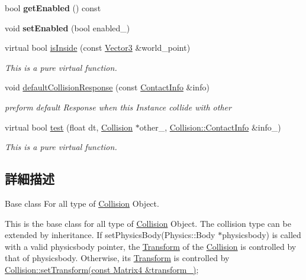 \begin{DoxyCompactItemize}
\item 
bool {\bfseries get\+Enabled} () const \hypertarget{class_i_dream_sky_1_1_collision_aa8e71c31006f4f13d8c3976605a68065}{}\label{class_i_dream_sky_1_1_collision_aa8e71c31006f4f13d8c3976605a68065}

\item 
void {\bfseries set\+Enabled} (bool enabled\+\_\+)\hypertarget{class_i_dream_sky_1_1_collision_a4cf7e1b0fc9cebfbf145265f0f21dfdc}{}\label{class_i_dream_sky_1_1_collision_a4cf7e1b0fc9cebfbf145265f0f21dfdc}

\item 
virtual bool \hyperlink{class_i_dream_sky_1_1_collision_ab68f79686bcba6964e528f46485c65f7}{is\+Inside} (const \hyperlink{class_i_dream_sky_1_1_vector3}{Vector3} \&world\+\_\+point)
\begin{DoxyCompactList}\small\item\em This is a pure virtual function. \end{DoxyCompactList}\item 
void \hyperlink{class_i_dream_sky_1_1_collision_a3add6ba3c46ce3a728b3f27ddefd81d2}{default\+Collision\+Response} (const \hyperlink{class_i_dream_sky_1_1_collision_1_1_contact_info}{Contact\+Info} \&info)
\begin{DoxyCompactList}\small\item\em preform default Response when this Instance collide with other \end{DoxyCompactList}\item 
virtual bool \hyperlink{class_i_dream_sky_1_1_collision_ae4a334102a55d648b2033fd24af5ac86}{test} (float dt, \hyperlink{class_i_dream_sky_1_1_collision}{Collision} $\ast$other\+\_\+, \hyperlink{class_i_dream_sky_1_1_collision_1_1_contact_info}{Collision\+::\+Contact\+Info} \&info\+\_\+)
\begin{DoxyCompactList}\small\item\em This is a pure virtual function. \end{DoxyCompactList}\end{DoxyCompactItemize}


\subsection{詳細描述}
Base class For all type of \hyperlink{class_i_dream_sky_1_1_collision}{Collision} Object. 

This is the base class for all type of \hyperlink{class_i_dream_sky_1_1_collision}{Collision} Object. The collision type can be extended by inheritance. If set\+Physics\+Body(\+Physics\+::\+Body $\ast$physicsbody) is called with a valid physicsbody pointer, the \hyperlink{class_i_dream_sky_1_1_transform}{Transform} of the \hyperlink{class_i_dream_sky_1_1_collision}{Collision} is controlled by that of physicsbody. Otherwise, its \hyperlink{class_i_dream_sky_1_1_transform}{Transform} is controlled by \hyperlink{class_i_dream_sky_1_1_collision_ac7719f4d3e922b0234889d58987d5542}{Collision\+::set\+Transform(const Matrix4 \&transform\+\_\+)}; 

